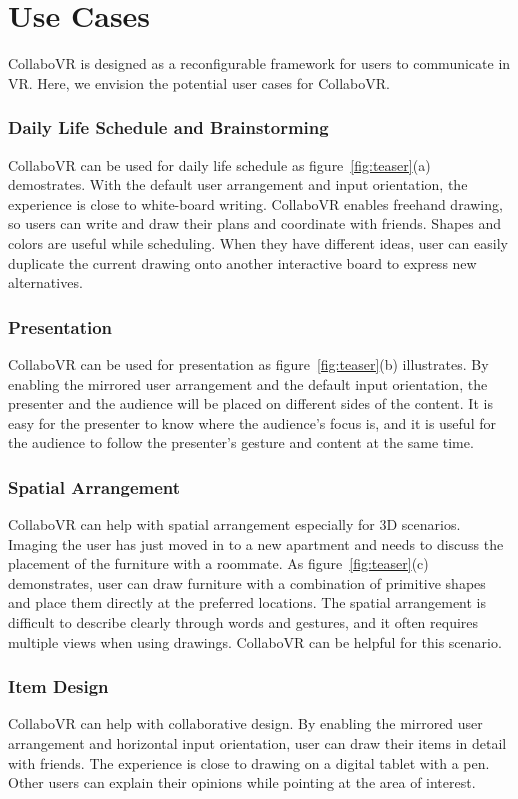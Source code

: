 \documentclass{sigchi}
\begin{document}
\section{Use Cases}
CollaboVR is designed as a reconfigurable framework for users to communicate in VR. Here, we envision the potential user cases for CollaboVR.

\subsubsection{Daily Life Schedule and Brainstorming}
CollaboVR can be used for daily life schedule as figure~\ref{fig:teaser}(a) demostrates. With the default user arrangement and input orientation, the experience is close to white-board writing. CollaboVR enables freehand drawing, so users can write and draw their plans and coordinate with friends. Shapes and colors are useful while scheduling. When they have different ideas, user can easily duplicate the current drawing onto another interactive board to express new alternatives.

\subsubsection{Presentation}
CollaboVR can be used for presentation as figure~\ref{fig:teaser}(b) illustrates. By enabling the mirrored user arrangement and the default input orientation, the presenter and the audience will be placed on different sides of the content. It is easy for the presenter to know where the audience's focus is, and it is useful for the audience to follow the presenter's gesture and content at the same time.

\subsubsection{Spatial Arrangement}
CollaboVR can help with spatial arrangement especially for 3D scenarios. Imaging the user has just moved in to a new apartment and needs to discuss the placement of the furniture with a roommate. As figure~\ref{fig:teaser}(c) demonstrates, user can draw furniture with a combination of primitive shapes and place them directly at the preferred locations. The spatial arrangement is difficult to describe clearly through words and gestures, and it often requires multiple views when using drawings. CollaboVR can be helpful for this scenario.

\subsubsection{Item Design}
CollaboVR can help with collaborative design. By enabling the mirrored user arrangement and horizontal input orientation, user can draw their items in detail with friends. The experience is close to drawing on a digital tablet with a pen. Other users can explain their opinions while pointing at the area of interest.
\end{document}
